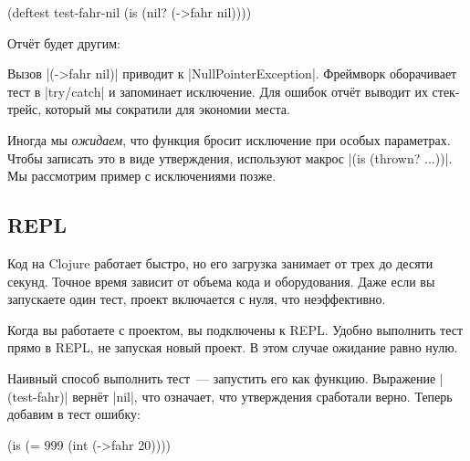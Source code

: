 \begin{english}
  \begin{clojure}
(deftest test-fahr-nil
  (is (nil? (->fahr nil))))
  \end{clojure}
\end{english}

Отч\"{е}т будет другим:

\begin{english}
\end{english}


Вызов \spverb|(->fahr nil)| приводит к \spverb|NullPointerException|. Фреймворк
оборачивает тест в \spverb|try/catch| и запоминает исключение. Для ошибок отч\"{е}т
выводит их стек-трейс, который мы сократили для экономии места.

Иногда мы \emph{ожидаем}, что функция бросит исключение при особых
параметрах. Чтобы записать это в виде утверждения, используют макрос
\spverb|(is (thrown? ...))|. Мы рассмотрим пример с исключениями позже.

\subsection{REPL}


Код на Clojure работает быстро, но его загрузка занимает от трех до десяти
секунд. Точное время зависит от объема кода и оборудования. Даже если вы
запускаете один тест, проект включается с нуля, что неэффективно.

Когда вы работаете с проектом, вы подключены к REPL. Удобно выполнить тест прямо
в REPL, не запуская новый проект. В этом случае ожидание равно нулю.

Наивный способ выполнить тест~--- запустить его как функцию. Выражение
\spverb|(test-fahr)| верн\"{е}т \spverb|nil|, что означает, что утверждения
сработали верно. Теперь добавим в тест ошибку:

\begin{english}
  \begin{clojure}
(is (= 999 (int (->fahr 20))))
  \end{clojure}
\end{english}


